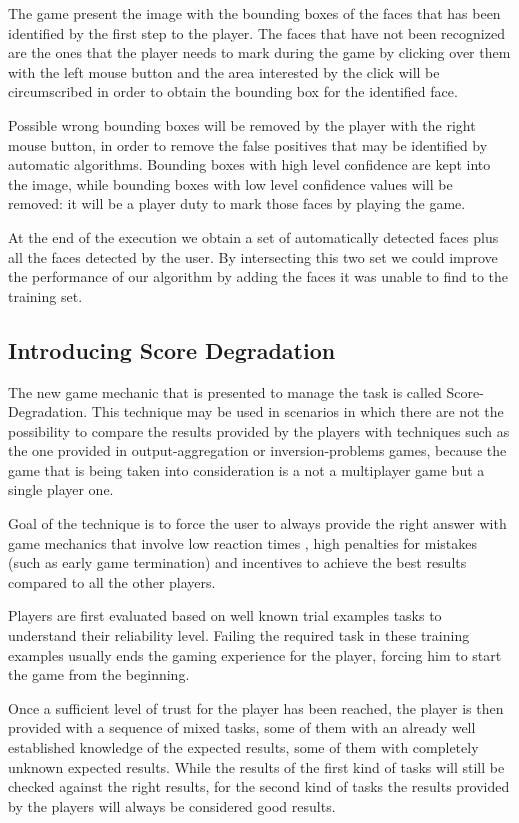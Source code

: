 The game present the image with the bounding boxes of the faces that has been
identified by the first step to the player. The faces that have not been
recognized are the ones that the player needs to mark during the game by
clicking over them with the left mouse button and the area interested by the
click will be circumscribed in order to obtain the bounding box for the identified
face. 

Possible wrong bounding boxes will be removed by the player with the right mouse
button, in order to remove the false positives that may be identified by automatic
algorithms. Bounding boxes with high level confidence are kept into the image,
while bounding boxes with low level confidence values will be removed: it will
be a player duty to mark those faces by playing the game.

At the end of the execution we obtain a set of automatically detected faces plus
all the faces detected by the user. By intersecting this two set we could improve
the performance of our algorithm by adding the faces it was unable to find to
the training set.

\subsection{Introducing Score Degradation}
The new game mechanic that is presented to manage the task is called
Score-Degradation. This technique may be used in scenarios in which there are not
the possibility to compare the results provided by the players with techniques
such as the one provided in output-aggregation or inversion-problems games,
because the game that is being taken into consideration is a not a multiplayer
game but a single player one.

Goal of the technique is to force the user to always provide the right answer
with game mechanics that involve low reaction times , high penalties for mistakes
(such as early game termination) and incentives to achieve the best results
compared to all the other players.

Players are first evaluated based on well known trial examples tasks to understand
their reliability level. Failing the required task in these training examples
usually ends the gaming experience for the player, forcing him to start the game
from the beginning.

Once a sufficient level of trust for the player has been reached, the player is
then provided with a sequence of mixed tasks, some of them with an already well
established knowledge of the expected results, some of them with completely
unknown expected results. While the results of the first kind of tasks will
still be checked against the right results, for the second kind of tasks the
results provided by the players will always be considered good results.

